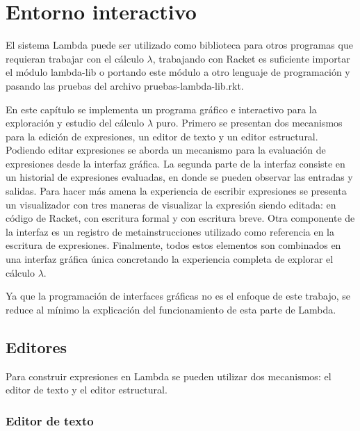 \documentclass[letterpaper, twoside, openright, 11pt]{book}%
\newcommand{\titulo}{{\Tt{}Lambda\nwendquote}}
\begin{document}
\chapter{Entorno interactivo}
\markboth{
  \normalsize\hfill\textit{\titulo}\hfill
}{
  \normalsize\hfill\textit{\thechapter.\ \ Entorno interactivo}\hfill
}
\label{ap2:entorno-interactivo}

El sistema {\Tt{}Lambda\nwendquote} puede ser utilizado como biblioteca para otros programas que requieran trabajar con el cálculo \( λ \), trabajando con {\Tt{}Racket\nwendquote} es suficiente importar el módulo {\Tt{}lambda-lib\nwendquote} o portando este módulo a otro lenguaje de programación y pasando las pruebas del archivo {\Tt{}pruebas-lambda-lib.rkt\nwendquote}.

En este capítulo se implementa un programa gráfico e interactivo para la exploración y estudio del cálculo \( λ \) puro. Primero se presentan dos mecanismos para la edición de expresiones, un editor de texto y un editor estructural. Podiendo editar expresiones se aborda un mecanismo para la evaluación de expresiones desde la interfaz gráfica. La segunda parte de la interfaz consiste en un historial de expresiones evaluadas, en donde se pueden observar las entradas y salidas. Para hacer más amena la experiencia de escribir expresiones se presenta un visualizador con tres maneras de visualizar la expresión siendo editada: en código de {\Tt{}Racket\nwendquote}, con escritura formal y con escritura breve. Otra componente de la interfaz es un registro de metainstrucciones utilizado como referencia en la escritura de expresiones. Finalmente, todos estos elementos son combinados en una interfaz gráfica única concretando la experiencia completa de explorar el cálculo \( λ \).

Ya que la programación de interfaces gráficas no es el enfoque de este trabajo, se reduce al mínimo la explicación del funcionamiento de esta parte de {\Tt{}Lambda\nwendquote}.

\section{Editores}

Para construir expresiones en {\Tt{}Lambda\nwendquote} se pueden utilizar dos mecanismos: el editor de texto y el editor estructural.

\subsection{Editor de texto}
\end{document}
